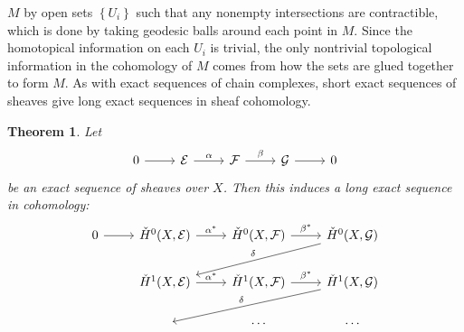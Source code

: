 \documentclass[psamsfonts, 12pt]{amsart}
\newtheorem{thm}{Theorem}[section]
\theoremstyle{definition}
\theoremstyle{remark}
\newcommand{\set}[1]{\left\lbrace #1 \right\rbrace}
\begin{document}
$M$ by open sets $\set{U_i}$ such that any nonempty intersections are contractible,
which is done by taking geodesic balls around each point in $M$. Since the
homotopical information on each $U_i$ is trivial, the only nontrivial topological
information in the cohomology of $M$ comes from how the sets are glued together to
form $M$. As with exact sequences of chain complexes, short exact sequences
of sheaves give long exact sequences in sheaf cohomology.
%
\begin{thm}
Let
\[\begin{tikzcd}
0 \ar[r] & \mathcal{E} \ar[r, "\alpha"] & \mathcal{F} \ar[r, "\beta"] & \mathcal{G}
\ar[r] & 0
\end{tikzcd}\]
be an exact sequence of sheaves over $X$. Then this induces a long exact sequence in
cohomology:
\[\begin{tikzcd}
0 \ar[r] & \check{H}^0(X,\mathcal{E}) \ar[r, "\alpha^*"]
& \check{H}^0(X,\mathcal{F}) \ar[r, "\beta^*"] &
\check{H}^0(X, \mathcal{G}) \ar[dll, "\delta"'] \\
& \check{H}^1(X, \mathcal{E}) \ar[r, "\alpha^*"]
& \check{H}^1(X, \mathcal{F})\ar[r, "\beta^*"]
& \check{H}^1(X, \mathcal{G}) \ar[dll, "\delta"'] \\
& ~ & \cdots & \cdots
\end{tikzcd}\]
\end{thm}
%
\end{document}
